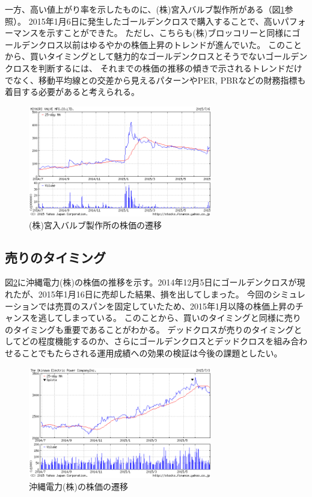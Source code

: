 \documentclass[twocolumn,jsaiac]{jarticle}
\begin{document}
一方、高い値上がり率を示したものに、(株)宮入バルブ製作所がある（図\ref{fig:miyairi}参照）。
2015年1月6日に発生したゴールデンクロスで購入することで、高いパフォーマンスを示すことができた。
ただし、こちらも(株)ブロッコリーと同様にゴールデンクロス以前はゆるやかの株価上昇のトレンドが進んでいた。
このことから、買いタイミングとして魅力的なゴールデンクロスとそうでないゴールデンクロスを判断するには、
それまでの株価の推移の傾きで示されるトレンドだけでなく、移動平均線との交差から見えるパターンやPER, PBRなどの財務指標も着目する必要があると考えられる。
\begin{figure}[htb]
\begin{center}
\includegraphics[width=8cm,clip]{miyairi.png}
\end{center}
\caption{(株)宮入バルブ製作所の株価の遷移}
\label{fig:miyairi}
\end{figure}

\subsection{売りのタイミング}
図\ref{fig:okinawa}に沖縄電力(株)の株価の推移を示す。2014年12月5日にゴールデンクロスが現れたが、2015年1月16日に売却した結果、損を出してしまった。
今回のシミュレーションでは売買のスパンを固定していたため、2015年1月以降の株価上昇のチャンスを逃してしまっている。
このことから、買いのタイミングと同様に売りのタイミングも重要であることがわかる。
デッドクロスが売りのタイミングとしてどの程度機能するのか、さらにゴールデンクロスとデッドクロスを組み合わせることでもたらされる運用成績への効果の検証は今後の課題としたい。
\begin{figure}[htb]
\begin{center}
\includegraphics[width=8cm,clip]{okinawa.png}
\end{center}
\caption{沖縄電力(株)の株価の遷移}
\label{fig:okinawa}
\end{figure}
\end{document}

